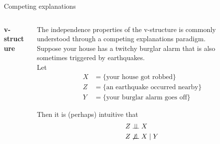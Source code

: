 \documentclass[10pt]{beamer}
\begin{document}
 \begin{frame}{Competing explanations}

\begin{columns}[onlytextwidth,t]
 \begin{column}{0.3\textwidth}
  \centering
    \textbf{v-structure} \\[.3cm]
		   \\[.3cm]
    \end{column}
    
 \begin{column}{0.6\textwidth}
 \scriptsize
The independence properties of the v-structure is commonly understood through a \alert{competing explanations} paradigm. \\[.3cm]
Suppose your house has a twitchy burglar alarm that is also sometimes triggered by earthquakes.    \\[.3cm]

Let 
\begin{align*}
 X &= \{ \text{your house got robbed} \} \\
 Z &= \{ \text{an earthquake occurred nearby} \} \\
  Y &= \{ \text{your burglar alarm goes off} \}  
 \end{align*}
 
 Then it is \tiny (perhaps) \scriptsize intuitive that
 \begin{align*}
   Z & \perp \!\!\! \perp X  \\
   Z & \not\perp \!\!\! \perp X \; | \; Y
 \end{align*}
 
  \end{column}
    
\end{columns}
\end{frame}
\end{document}
